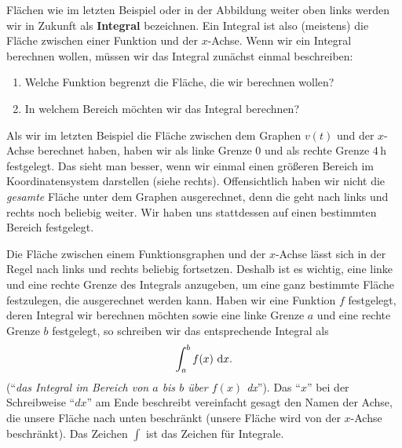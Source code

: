 \documentclass[../../main.tex]{subfiles}
\begin{document}
Flächen wie im letzten Beispiel oder in der Abbildung weiter oben links werden wir in Zukunft als \textbf{Integral} 
bezeichnen. Ein Integral ist also (meistens) die Fläche zwischen einer Funktion und der $x$-Achse. Wenn wir ein Integral
berechnen wollen, müssen wir das Integral zunächst einmal beschreiben:
\begin{enumerate}
    \item Welche Funktion begrenzt die Fläche, die wir berechnen wollen?
    \item In welchem Bereich möchten wir das Integral berechnen?
\end{enumerate}
\begin{example}{}
    Als wir im letzten Beispiel die Fläche zwischen dem Graphen $v(t)$ und der $x$-Achse berechnet haben, haben wir
    als linke Grenze $0$ und als rechte Grenze $4\,\text{h}$ festgelegt. Das sieht man besser, wenn wir einmal einen 
    größeren Bereich im Koordinatensystem darstellen (siehe rechts). Offensichtlich haben wir nicht die \emph{gesamte} 
    Fläche unter dem Graphen ausgerechnet, denn die geht nach links und rechts noch beliebig weiter. Wir haben uns
    stattdessen auf einen bestimmten Bereich festgelegt.
\end{example}
Die Fläche zwischen einem Funktionsgraphen und der $x$-Achse lässt sich in der Regel nach links und rechts beliebig
fortsetzen. Deshalb ist es wichtig, eine linke und eine rechte Grenze des Integrals anzugeben, um eine ganz bestimmte
Fläche festzulegen, die ausgerechnet werden kann. Haben wir eine Funktion $f$ festgelegt, deren Integral wir berechnen
möchten sowie eine linke Grenze $a$ und eine rechte Grenze $b$ festgelegt, so schreiben wir das entsprechende Integral 
als
\[\int_a^bf(x)\mathop{}\mathrm{d} x.\]
(\enquote{\emph{das Integral im Bereich von $a$ bis $b$ über $f(x)$ dx}}). Das \enquote{$x$} bei der Schreibweise 
\enquote{$dx$} am Ende beschreibt vereinfacht gesagt den Namen 
der Achse, die unsere Fläche nach unten beschränkt (unsere Fläche wird von der $x$-Achse beschränkt). Das Zeichen $\int$
ist das Zeichen für Integrale.
\end{document}
